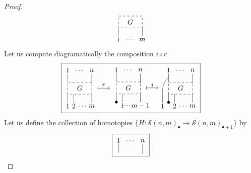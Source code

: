 \documentclass{amsart}
\renewcommand{\S}{\mathcal{S}}
\theoremstyle{definition}
\begin{document}
\begin{proof}
\begin{equation*}
{\begin{tikzpicture}[scale=.6]
			\draw [dashed] (0,0) rectangle (2,1); \node at (1, .5) {$G$};
			
			\node at (0,-1) {$1$}; \draw (0,-.7) -- (0,0);
			\node at (1,-1) {$\dots$};
			\node at (2,-1) {$m$}; \draw (2,-.7) -- (2,0);
			\end{tikzpicture}}
		\end{equation*}
		Let us compute diagramatically the composition $i\circ r$
		\begin{equation*}
		\boxed{\begin{tikzpicture}[scale=.6]
			\node at (0,2) {$1$}; \draw (0,1.7) -- (0,1);
			\node at (1,2) {$\dots$};
			\node at (2,2) {$n$}; \draw (2,1.7) -- (2,.9);
			
			\draw [dashed] (0,0) rectangle (2,1); \node at (1, .5) {$G$};
			
			\draw (0,-.7) -- (0,0);
			\node at (0,-1) {$1$};
			\node at (.5,-1) {$2$}; \draw (.5,-.7) -- (.5,0);
			\node at (1.25,-1) {$\dots$};
			\node at (2,-1) {$m$}; \draw (2,-.7) -- (2,0);
			
			\node at (3,.75) {$r$}; \draw [|->] (2.5,.5) -- (3.5,.5);
			\end{tikzpicture}
			\   %
			\begin{tikzpicture}[scale=.6]
			\node at (0,2) {$1$}; \draw (0,1.7) -- (0,1);
			\node at (1,2) {$\dots$};
			\node at (2,2) {$n$}; \draw (2,1.7) -- (2,.9);
			
			\draw [dashed] (0,0) rectangle (2,1); \node at (1, .5) {$G$};
			
			\node at(0,-.7) {$\bullet$}; \draw (0,-.7) -- (0,0);
			\node at (.5,-1) {$1$}; \draw (.5,-.7) -- (.5,0);
			\node at (.9,-1) {$\cdot\!\cdot\!\cdot$};
			\node at (2,-1) {$m-1$}; \draw (2,-.7) -- (2,0);
			
			\node at (3,.75) {$i$}; \draw [|->] (2.5,.5) -- (3.5,.5);
			\end{tikzpicture}
			\begin{tikzpicture}[scale=.6]
			\node at (0,2) {$1$}; \draw (0,1.7) -- (0,1);
			\node at (1,2) {$\dots$};
			\node at (2,2) {$n$}; \draw (2,1.7) -- (2,.9);
			
			\draw [dashed] (0,0) rectangle (2,1); \node at (1, .5) {$G$};
			
			\node at (-.5,-1) {$1$}; \draw (-.5,-.7)  to[out=90,in=-140]  (0,1.4);
			\node at (0,-.7) {$\bullet$}; \draw (0,-.7) -- (0,0);
			\node at (.5,-1) {$2$}; \draw (.5,-.7) -- (.5,0);
			\node at (1.25,-1) {$\dots$};
			\node at (2,-1) {$m$}; \draw (2,-.7) -- (2,0);
			\end{tikzpicture}}
		\end{equation*}
		Let us define the collection of homotopies $\{H:\S(n,m)_\bullet\to\S(n,m)_{\bullet+1}\}$ by
		\begin{equation*}
		\boxed{\begin{tikzpicture}[scale=.6]
			\node at (0,2) {$1$}; \draw (0,1.7) -- (0,1);
			\node at (1,2) {$\dots$};
			\node at (2,2) {$n$}; \draw (2,1.7) -- (2,.9);
			

\end{tikzpicture}}
\end{equation*}
\end{proof}
\end{document}
